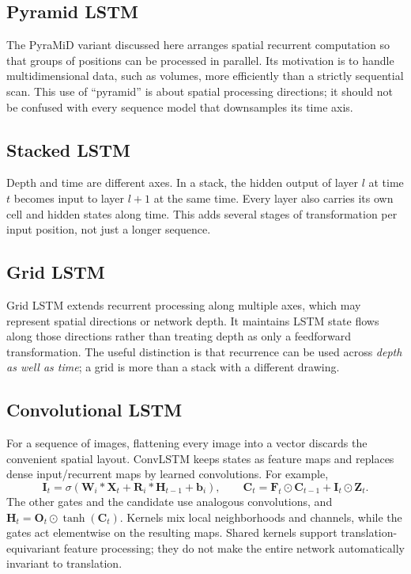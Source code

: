 \documentclass[11pt, oneside]{book}
\let\originalsubsection\subsection
\renewcommand{\subsection}{\Needspace{6\baselineskip}\originalsubsection}
\begin{document}
\subsection{Pyramid LSTM}\label{sec:source-3-6-4}
The PyraMiD variant discussed here arranges spatial recurrent computation so that groups of positions can be processed in parallel. Its motivation is to handle multidimensional data, such as volumes, more efficiently than a strictly sequential scan. This use of ``pyramid'' is about spatial processing directions; it should not be confused with every sequence model that downsamples its time axis.

\subsection{Stacked LSTM}\label{sec:source-3-6-5}
Depth and time are different axes. In a stack, the hidden output of layer $l$ at time $t$ becomes input to layer $l+1$ at the same time. Every layer also carries its own cell and hidden states along time. This adds several stages of transformation per input position, not just a longer sequence.

\subsection{Grid LSTM}\label{sec:source-3-6-6}
Grid LSTM extends recurrent processing along multiple axes, which may represent spatial directions or network depth. It maintains LSTM state flows along those directions rather than treating depth as only a feedforward transformation. The useful distinction is that recurrence can be used across \emph{depth as well as time}; a grid is more than a stack with a different drawing.

\subsection{Convolutional LSTM}\label{sec:source-3-6-7}
For a sequence of images, flattening every image into a vector discards the convenient spatial layout. ConvLSTM keeps states as feature maps and replaces dense input/recurrent maps by learned convolutions. For example,
\[
 \mathbf{I}_t=\sigma(\mathbf{W}_i*\mathbf{X}_t+
                         \mathbf{R}_i*\mathbf{H}_{t-1}+\mathbf{b}_i),
 \qquad
 \mathbf{C}_t=\mathbf{F}_t\odot\mathbf{C}_{t-1}+\mathbf{I}_t\odot\mathbf{Z}_t.
\]
The other gates and the candidate use analogous convolutions, and $\mathbf{H}_t=\mathbf{O}_t\odot\tanh(\mathbf{C}_t)$. Kernels mix local neighborhoods and channels, while the gates act elementwise on the resulting maps. Shared kernels support translation-equivariant feature processing; they do not make the entire network automatically invariant to translation.
\end{document}
